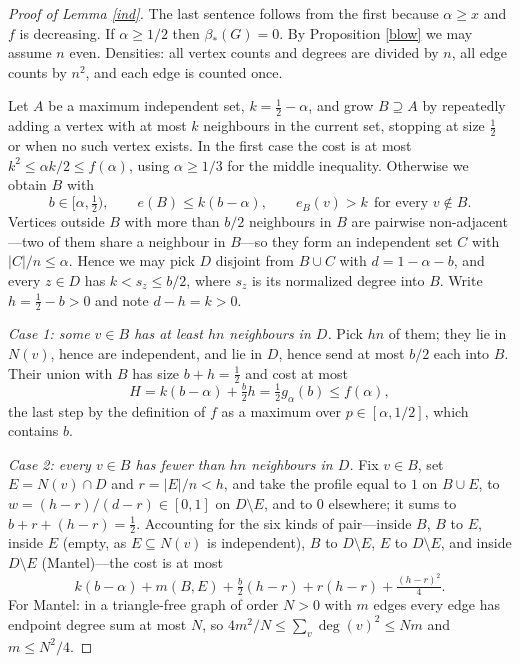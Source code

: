 \documentclass[11pt]{article}
\theoremstyle{remark}
\newcommand{\bh}{\beta_*}
\begin{document}
\begin{proof}[Proof of Lemma \ref{ind}]
The last sentence follows from the first because $\alpha\ge x$ and $f$ is
decreasing. If $\alpha\ge1/2$ then $\bh(G)=0$. By Proposition \ref{blow} we
may assume $n$ even. Densities: all vertex counts and degrees are divided by
$n$, all edge counts by $n^2$, and each edge is counted once.

Let $A$ be a maximum independent set, $k=\frac12-\alpha$, and grow $B\supseteq
A$ by repeatedly adding a vertex with at most $k$ neighbours in the current
set, stopping at size $\frac12$ or when no such vertex exists. In the first
case the cost is at most $k^2\le\alpha k/2\le f(\alpha)$, using $\alpha\ge1/3$
for the middle inequality. Otherwise we obtain $B$ with
\begin{equation}\label{Bprops}
 b\in[\alpha,\tfrac12),\qquad e(B)\le k(b-\alpha),\qquad
 e_B(v)>k\ \ \text{for every } v\notin B .
\end{equation}
Vertices outside $B$ with more than $b/2$ neighbours in $B$ are pairwise
non-adjacent---two of them share a neighbour in $B$---so they form an
independent set $C$ with $|C|/n\le\alpha$. Hence we may pick $D$ disjoint from
$B\cup C$ with $d=1-\alpha-b$, and every $z\in D$ has $k<s_z\le b/2$, where
$s_z$ is its normalized degree into $B$. Write $h=\frac12-b>0$ and note
$d-h=k>0$.

\emph{Case 1: some $v\in B$ has at least $hn$ neighbours in $D$.} Pick $hn$ of
them; they lie in $N(v)$, hence are independent, and lie in $D$, hence send at
most $b/2$ each into $B$. Their union with $B$ has size $b+h=\frac12$ and cost
at most
\[
 H=k(b-\alpha)+\tfrac b2 h=\tfrac12 g_\alpha(b)\le f(\alpha),
\]
the last step by the definition of $f$ as a maximum over $p\in[\alpha,1/2]$,
which contains $b$.

\emph{Case 2: every $v\in B$ has fewer than $hn$ neighbours in $D$.} Fix
$v\in B$, set $E=N(v)\cap D$ and $r=|E|/n<h$, and take the profile equal to
$1$ on $B\cup E$, to $w=(h-r)/(d-r)\in[0,1]$ on $D\setminus E$, and to $0$
elsewhere; it sums to $b+r+(h-r)=\frac12$. Accounting for the six kinds of
pair---inside $B$, $B$ to $E$, inside $E$ (empty, as $E\subseteq N(v)$ is
independent), $B$ to $D\setminus E$, $E$ to $D\setminus E$, and inside
$D\setminus E$ (Mantel)---the cost is at most
\[
 k(b-\alpha)+m(B,E)+\tfrac b2(h-r)+r(h-r)+\tfrac{(h-r)^2}{4}.
\]
For Mantel: in a triangle-free graph of order $N>0$ with $m$ edges every edge
has endpoint degree sum at most $N$, so
$4m^2/N\le\sum_v\deg(v)^2\le Nm$ and $m\le N^2/4$.


\end{proof}
\end{document}
